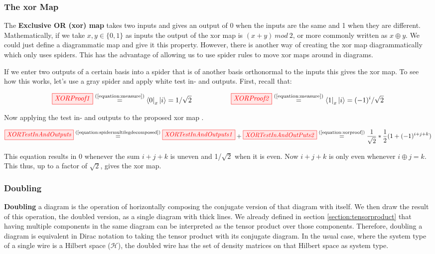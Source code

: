 \documentclass[]{article}
\newcommand{\equaltext}[1]{\ensuremath{\stackrel{\text{#1}}{=}}}
\begin{document}
\subsubsection{The xor Map}

\label{xorgate}

The \textbf{Exclusive OR (xor) map} takes two inputs and gives an output of 0 when the inputs are the same and 1 when they are different. Mathematically, if we take $x, y \in \{0,1\} $ as inputs the output of the xor map is $(x + y)~mod~2$, or more commonly written as $x \oplus y$. We could just define a diagrammatic map and give it this property. However, there is another way of creating the xor map diagrammatically which only uses spiders. This has the advantage of allowing us to use spider rules to move xor maps around in diagrams.

If we enter two outputs of a certain basis into a spider that is of another basis orthonormal to the inputs this gives the xor map. To see how this works, let's use a gray spider and apply white test in- and outputs. First, recall that:

\begin{equation}
\label{equation:xorproof}
\tikzfig{XORProof1} \equaltext{(\ref{equation:measure})} \bra{0}_x\ket{i} =  1/\sqrt{2} ~~~~~~~~~~~~~~~~~ \tikzfig{XORProof2} \equaltext{(\ref{equation:measure})} \bra{1}_x\ket{i} = (-1)^i/\sqrt{2}
\end{equation}

Now applying the test in- and outputs to the proposed xor map \cite{Coecke2017}.

\begin{equation}
\label{equation:xormap}
\tikzfig{XORTestInAndOutputs} \equaltext{(\ref{equation:spidermultilegdecomposed})} \tikzfig{XORTestInAndOutputs1} + \tikzfig{XORTestInAndOutPuts2} \equaltext{(\ref{equation:xorproof})} \frac{1}{\sqrt{2}} * \frac{1}{2}(1+(-1)^{i+j+k})
\end{equation}

This equation results in 0 whenever the sum $i+j+k$ is uneven and 1/$\sqrt{2}$ when it is even. Now $i+j+k$ is only even whenever $i \oplus j = k$. This thus, up to a factor of $\sqrt{2}$, gives the xor map.


\subsubsection{Doubling}
\label{doubling}

\textbf{Doubling} a diagram is the operation of horizontally composing the conjugate version of that diagram with itself. We then draw the result of this operation, the doubled version, as a single diagram with thick lines. We already defined in section \ref{section:tensorproduct} that having multiple components in the same diagram can be interpreted as the tensor product over those components. Therefore, doubling a diagram is equivalent in Dirac notation to taking the tensor product with its conjugate diagram. In the usual case, where the system type of a single wire is a Hilbert space ($\mathcal{H}$), the doubled wire has the set of density matrices on that Hilbert space as system type.
\end{document}
